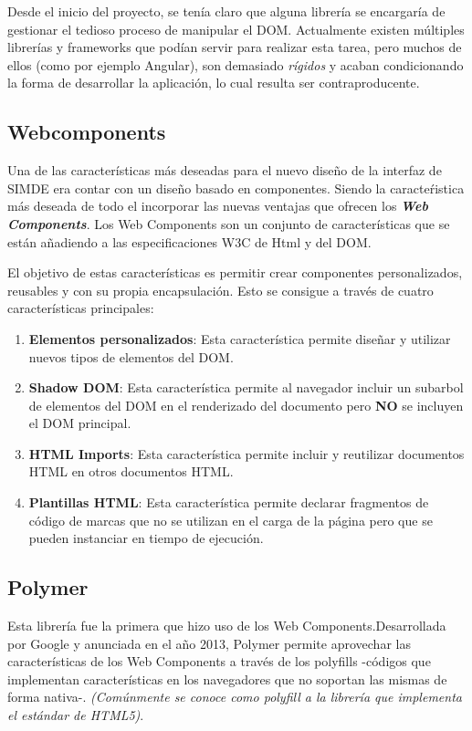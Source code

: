 Desde el inicio del proyecto, se tenía claro que alguna librería se encargaría de gestionar
 el tedioso proceso de manipular el DOM. Actualmente existen múltiples librerías 
y frameworks que podían servir para realizar esta tarea, pero muchos de ellos (como por ejemplo Angular),
son demasiado \textit{rígidos} y acaban condicionando la forma de desarrollar la aplicación, 
lo cual resulta ser contraproducente.

\subsection{Webcomponents}

\bigskip
Una de las características más deseadas para el nuevo diseño de la interfaz de SIMDE era contar con
un diseño basado en componentes. Siendo la caracteŕistica más deseada de todo el incorporar las nuevas 
ventajas que ofrecen los \textit\textbf{Web Components}. Los Web Components son un conjunto de 
características que se están añadiendo a las especificaciones W3C de Html y del DOM. \cite{Webcomponents}

\bigskip 
El objetivo de estas características es permitir crear componentes personalizados, reusables y 
con su propia encapsulación. Esto se consigue a través de cuatro características principales:

\begin{enumerate}

\item \textbf{Elementos personalizados}: Esta característica permite diseñar y utilizar nuevos tipos 
de elementos del DOM.
\item \textbf{Shadow DOM}: Esta característica permite al navegador incluir un subarbol de elementos del 
DOM en el renderizado del documento pero \textbf{NO} se incluyen el DOM principal.
\item \textbf{HTML Imports}: Esta característica permite incluir y reutilizar documentos HTML en otros 
documentos HTML.
\item \textbf{Plantillas HTML}: Esta característica permite declarar fragmentos de código de marcas que no
se utilizan en el carga de la página pero que se pueden instanciar en tiempo de ejecución. 

\end{enumerate}

\subsection{Polymer}
Esta librería fue la primera que hizo uso de los Web Components.Desarrollada por Google y anunciada en 
el año 2013, Polymer permite aprovechar las características de los Web Components \cite{Polymer} a través de los polyfills 
-códigos que implementan características en los navegadores que no soportan las mismas de forma nativa-.
\textit{(Comúnmente se conoce como polyfill a la librería que implementa el estándar de HTML5)}. \cite{Polyfill} 

